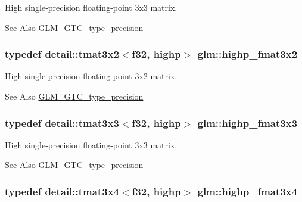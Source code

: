 High single-\/precision floating-\/point 3x3 matrix. \begin{DoxySeeAlso}{See Also}
\hyperlink{group__gtc__type__precision}{G\-L\-M\-\_\-\-G\-T\-C\-\_\-type\-\_\-precision} 
\end{DoxySeeAlso}
\hypertarget{group__gtc__type__precision_gad5c083691eb15539fd81e27e1dc6b813}{
\subsubsection[{highp\-\_\-fmat3x2}]{\setlength{\rightskip}{0pt plus 5cm}typedef detail\-::tmat3x2$<$f32, highp$>$ {\bf glm\-::highp\-\_\-fmat3x2}}}\label{group__gtc__type__precision_gad5c083691eb15539fd81e27e1dc6b813}
High single-\/precision floating-\/point 3x2 matrix. \begin{DoxySeeAlso}{See Also}
\hyperlink{group__gtc__type__precision}{G\-L\-M\-\_\-\-G\-T\-C\-\_\-type\-\_\-precision} 
\end{DoxySeeAlso}
\hypertarget{group__gtc__type__precision_gaf1d697243b1de74a5769c49e68b1e2a6}{
\subsubsection[{highp\-\_\-fmat3x3}]{\setlength{\rightskip}{0pt plus 5cm}typedef detail\-::tmat3x3$<$f32, highp$>$ {\bf glm\-::highp\-\_\-fmat3x3}}}\label{group__gtc__type__precision_gaf1d697243b1de74a5769c49e68b1e2a6}
High single-\/precision floating-\/point 3x3 matrix. \begin{DoxySeeAlso}{See Also}
\hyperlink{group__gtc__type__precision}{G\-L\-M\-\_\-\-G\-T\-C\-\_\-type\-\_\-precision} 
\end{DoxySeeAlso}
\hypertarget{group__gtc__type__precision_ga1f377a3da21dd6c418ec3a5119a4514a}{
\subsubsection[{highp\-\_\-fmat3x4}]{\setlength{\rightskip}{0pt plus 5cm}typedef detail\-::tmat3x4$<$f32, highp$>$ {\bf glm\-::highp\-\_\-fmat3x4}}}\label{group__gtc__type__precision_ga1f377a3da21dd6c418ec3a5119a4514a}

